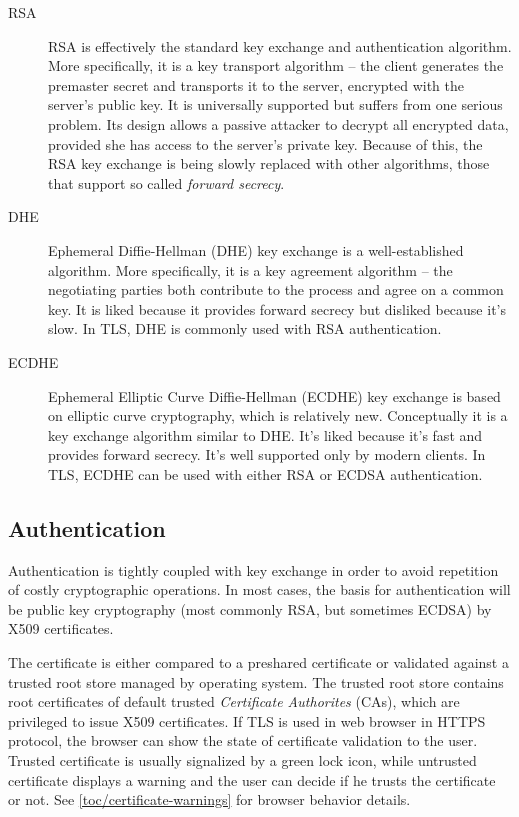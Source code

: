 \begin{description}
  \item[RSA] RSA is effectively the standard key exchange and authentication algorithm. More specifically, it is a key transport algorithm -- the client generates the premaster secret and transports it to the server, encrypted with the server's public key. It is universally supported but suffers from one serious problem. Its design allows a passive attacker to decrypt all encrypted data, provided she has access to the server's private key. Because of this, the RSA key exchange is being slowly replaced with other algorithms, those that support so called \textit{forward secrecy}.
  \item[DHE] Ephemeral Diffie-Hellman (DHE) key exchange is a well-established algorithm. More specifically, it is a key agreement algorithm -- the negotiating parties both contribute to the process and agree on a common key. It is liked because it provides forward secrecy but disliked because it's slow. In TLS, DHE is commonly used with RSA authentication.
  \item[ECDHE] Ephemeral Elliptic Curve Diffie-Hellman (ECDHE) key exchange is based on elliptic curve cryptography, which is relatively new. Conceptually it is a key exchange algorithm similar to DHE. It's liked because it's fast and provides forward secrecy. It's well supported only by modern clients. In TLS, ECDHE can be used with either RSA or ECDSA authentication. \cite{ristic2014bulletproof}
\end{description}

\subsection{Authentication}

Authentication is tightly coupled with key exchange in order to avoid repetition of costly cryptographic operations. In most cases, the basis for authentication will be public key cryptography (most commonly RSA, but sometimes ECDSA) by X509 certificates.

The certificate is either compared to a preshared certificate or validated against a trusted root store managed by operating system. The trusted root store contains root certificates of default trusted \textit{Certificate Authorites} (CAs), which are privileged to issue X509 certificates. If TLS is used in web browser in HTTPS protocol, the browser can show the state of certificate validation to the user. Trusted certificate is usually signalized by a green lock icon, while untrusted certificate displays a warning and the user can decide if he trusts the certificate or not. See \autoref{toc/certificate-warnings} for browser behavior details.

